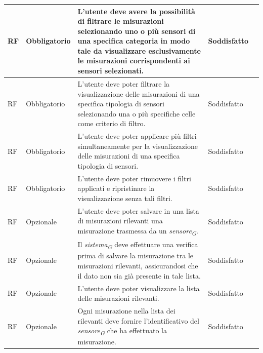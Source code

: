 \begin{longtable}{|C{1.5cm}|C{2cm}|L{5cm}|C{2cm}|C{1.5cm}|}
    \hline
     RF & Obbligatorio & L'utente deve avere la possibilità di filtrare le misurazioni selezionando uno o più sensori di una specifica categoria in modo tale da visualizzare esclusivamente le misurazioni corrispondenti ai sensori selezionati.& Soddisfatto \\
    
    \hline
     RF & Obbligatorio & L'utente deve poter filtrare la visualizzazione delle misurazioni di una specifica tipologia di sensori selezionando una o più specifiche celle come criterio di filtro.& Soddisfatto \\
    
    \hline
     RF & Obbligatorio & L'utente deve poter applicare più filtri simultaneamente per la visualizzazione delle misurazioni di una specifica tipologia di sensori.& Soddisfatto \\
    
    \hline
     RF & Obbligatorio & L'utente deve poter rimuovere i filtri applicati e ripristinare la visualizzazione senza tali filtri.& Soddisfatto \\

    \hline
     RF & Opzionale & L'utente deve poter salvare in una lista di misurazioni rilevanti una misurazione trasmessa da un \textit{sensore}\textsubscript{\textit{G}}.& Soddisfatto \\
    
    \hline
     RF & Opzionale & Il \textit{sistema}\textsubscript{\textit{G}} deve effettuare una verifica prima di salvare la misurazione tra le misurazioni rilevanti, assicurandosi che il dato non sia già presente in tale lista.& Soddisfatto \\
    
    \hline
     RF & Opzionale & L'utente deve poter visualizzare la lista delle misurazioni rilevanti.& Soddisfatto \\
    
    \hline
     RF & Opzionale & Ogni misurazione nella lista dei rilevanti deve fornire l'identificativo del \textit{sensore}\textsubscript{\textit{G}} che ha effettuato la misurazione.& Soddisfatto \\


\end{longtable}
